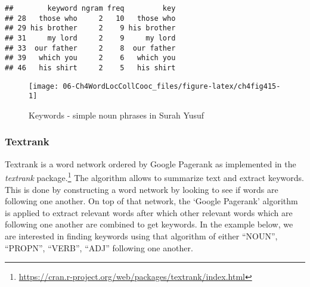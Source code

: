 \documentclass[
]{article}
\newenvironment{Shaded}{\begin{snugshade}}{\end{snugshade}}
\newcommand{\AttributeTok}[1]{\textcolor[rgb]{0.13,0.29,0.53}{#1}}
\newcommand{\DecValTok}[1]{\textcolor[rgb]{0.00,0.00,0.81}{#1}}
\newcommand{\FunctionTok}[1]{\textcolor[rgb]{0.13,0.29,0.53}{\textbf{#1}}}
\newcommand{\NormalTok}[1]{#1}
\newcommand{\OtherTok}[1]{\textcolor[rgb]{0.56,0.35,0.01}{#1}}
\newcommand{\SpecialCharTok}[1]{\textcolor[rgb]{0.81,0.36,0.00}{\textbf{#1}}}
\newcommand{\StringTok}[1]{\textcolor[rgb]{0.31,0.60,0.02}{#1}}
\begin{document}
\begin{verbatim}
##        keyword ngram freq         key
## 28   those who     2   10   those who
## 29 his brother     2    9 his brother
## 31     my lord     2    9     my lord
## 33  our father     2    8  our father
## 39   which you     2    6   which you
## 46   his shirt     2    5   his shirt
\end{verbatim}

\begin{figure}

{\centering \texttt{[image: 06-Ch4WordLocCollCooc\_files/figure-latex/ch4fig415-1]} 

}

\caption{Keywords - simple noun phrases in Surah Yusuf}\label{fig:ch4fig415}
\end{figure}

\hypertarget{textrank}{%
\subsubsection{Textrank}\label{textrank}}

Textrank is a word network ordered by Google Pagerank as implemented in the \emph{textrank} \citep{textrank} package.\footnote{\url{https://cran.r-project.org/web/packages/textrank/index.html}} The algorithm allows to summarize text and extract keywords. This is done by constructing a word network by looking to see if words are following one another. On top of that network, the `Google Pagerank' algorithm is applied to extract relevant words after which other relevant words which are following one another are combined to get keywords. In the example below, we are interested in finding keywords using that algorithm of either ``NOUN'', ``PROPN'', ``VERB'', ``ADJ'' following one another.

\footnotesize

\begin{Shaded}
\end{Shaded}
\end{document}
